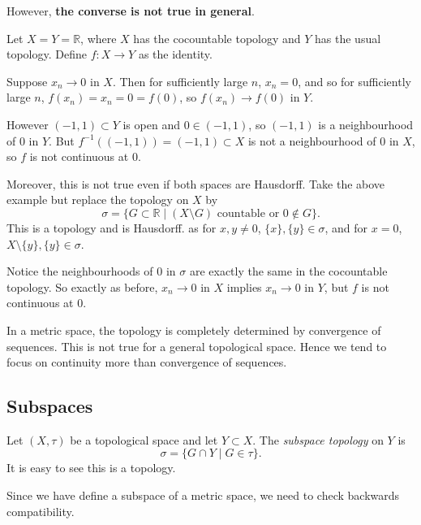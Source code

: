 \documentclass[12pt]{article}
\begin{document}
However, \textbf{the converse is not true in general}.

\begin{exbox}
	Let $X = Y = \mathbb{R}$, where $X$ has the cocountable topology and $Y$ has the usual topology. Define $f : X \to Y$ as the identity.

	Suppose $x_n \to 0$ in $X$. Then for sufficiently large $n$, $x_n = 0$, and so for sufficiently large $n$, $f(x_n) = x_n = 0 = f(0)$, so $f(x_n) \to f(0)$ in $Y$.

	However $(-1, 1) \subset Y$ is open and $0 \in (-1, 1)$, so $(-1, 1)$ is a neighbourhood of $0$ in $Y$. But $f^{-1}((-1, 1)) = (-1, 1) \subset X$ is not a neighbourhood of $0$ in $X$, so $f$ is not continuous at $0$.

	Moreover, this is not true even if both spaces are Hausdorff. Take the above example but replace the topology on  $X$ by
	\[
		\sigma = \{G \subset \mathbb{R} \mid (X \setminus G) \text{ countable or } 0 \not \in G\}
	.\]
	This is a topology and is Hausdorff. as for $x, y \neq 0$, $\{x\}, \{y\} \in \sigma$, and for $x = 0$, $X \setminus\{y\}, \{y\} \in \sigma$.

	Notice the neighbourhoods of $0$ in $\sigma$ are exactly the same in the cocountable topology. So exactly as before, $x_n \to 0$ in $X$ implies $x_n \to 0$ in $Y$, but $f$ is not continuous at $0$.
\end{exbox}

\begin{remark}
	In a metric space, the topology is completely determined by convergence of sequences. This is not true for a general topological space. Hence we tend to focus on continuity more than convergence of sequences.
\end{remark}

\subsection{Subspaces}%
\label{sub:subspaces}

\begin{definition}
	Let $(X, \tau)$ be a topological space and let $Y \subset X$. The \textit{subspace topology} on $Y$ is
	\[
		\sigma = \{G \cap Y \mid G \in \tau\}
	.\]
	It is easy to see this is a topology.
\end{definition}

Since we have define a subspace of a metric space, we need to check backwards compatibility.
\end{document}
